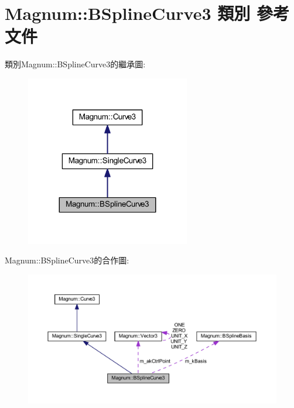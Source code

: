 \hypertarget{class_magnum_1_1_b_spline_curve3}{}\section{Magnum\+:\+:B\+Spline\+Curve3 類別 參考文件}
\label{class_magnum_1_1_b_spline_curve3}


類別\+Magnum\+:\+:B\+Spline\+Curve3的繼承圖\+:\nopagebreak
\begin{figure}[H]
\begin{center}
\leavevmode
\includegraphics[width=203pt]{class_magnum_1_1_b_spline_curve3__inherit__graph}
\end{center}
\end{figure}


Magnum\+:\+:B\+Spline\+Curve3的合作圖\+:\nopagebreak
\begin{figure}[H]
\begin{center}
\leavevmode
\includegraphics[width=350pt]{class_magnum_1_1_b_spline_curve3__coll__graph}
\end{center}
\end{figure}

